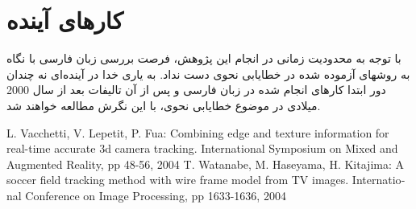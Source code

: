 \documentclass{report}
\renewcommand{\baselinestretch}{1.8}
\begin{document}
\section{کارهای آینده}
با توجه به محدودیت زمانی در انجام این پژوهش، فرصت بررسی زبان فارسی با نگاه به روشهای آزموده شده در خطایابی نحوی دست نداد. به یاری خدا در آینده‌ای نه چندان دور ابتدا کارهای انجام شده در زبان فارسی و پس از آن تالیفات بعد از سال 2000 میلادی در موضوع خطایابی نحوی، با این نگرش مطالعه خواهند شد.

\renewcommand{\baselinestretch}{1}
\renewcommand*{\refname}{\section{منابع}}
\begin{thebibliography}{9}
\begin{latin}
L. Vacchetti, V. Lepetit, P. Fua: Combining edge and texture information for real-time accurate 3d camera tracking. International Symposium on Mixed and Augmented Reality, pp 48-56, 2004
T. Watanabe, M. Haseyama, H. Kitajima: A soccer field tracking method with wire frame model from TV images. International Conference on Image Processing, pp 1633-1636, 2004

\end{latin}
\end{thebibliography}
\end{document}
